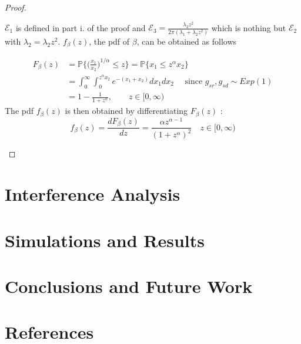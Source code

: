 \documentclass[titlepage]{article}
\begin{document}
\begin{proof}
\begin{itemize}
$\mathcal{E}_1$ is defined in part i. of the proof and  $\mathcal{E}_3 = \frac{\lambda_2 z^2}{2\pi(\lambda_1+\lambda_2z^2)}$ which is nothing but $\mathcal{E}_2$ with $\lambda_2 = \lambda_2z^2$. $f_\beta(z)$, the pdf of $\beta$, can be obtained as follows

\begin{align*}
F_\beta(z) &= \mathbb{P}\bigg\{ \bigg( \frac{x_1}{x_2}\bigg)^{1/\alpha} \leq z \bigg\} = \mathbb{P} \{ x_1\leq z^\alpha x_2\} \\
&= \int_0^\infty \int_0^{z^\alpha x_2} e^{-(x_1+x_2)} dx_1dx_2 \quad \text{ since } g_{sr},g_{sd} \sim Exp(1) \\
&= 1-\frac{1}{1+z^\alpha}, \qquad z \in [0,\infty)
\end{align*}
The pdf $f_\beta(z)$ is then obtained by differentiating $F_\beta(z)$ :
\begin{equation*}
    f_\beta(z) = \frac{dF_\beta(z)}{dz} = \frac{\alpha z^{\alpha-1}}{(1+z^\alpha)^2} \quad z \in [0,\infty)
\end{equation*}
\end{itemize}
\end{proof}
\section{Interference Analysis} \label{sec:interference}

\section{Simulations and Results}

\section{Conclusions and Future Work}

\section{References}
\end{document}
